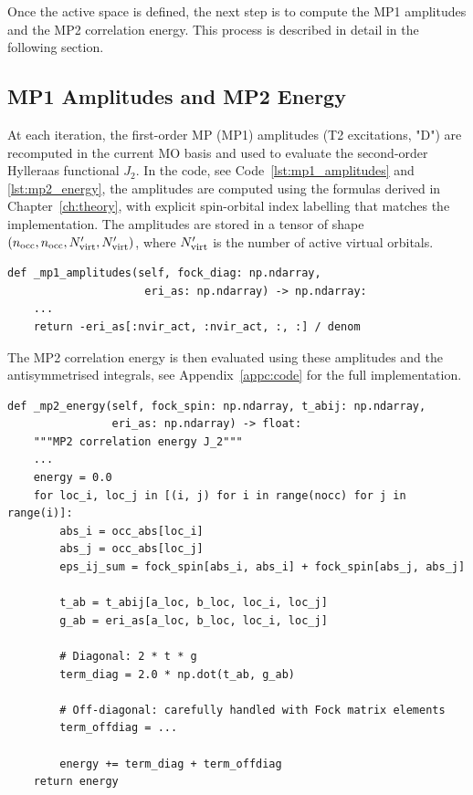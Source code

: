 Once the active space is defined, the next step is to compute the MP1 amplitudes and the MP2 correlation energy. This process is described in detail in the following section.

\subsection{MP1 Amplitudes and MP2 Energy}

At each iteration, the first-order MP (MP1) amplitudes (T2 excitations, "D") are recomputed in the current MO basis and used to evaluate the second-order Hylleraas functional $J_2$. In the code, see Code~\ref{lst:mp1_amplitudes} and \ref{lst:mp2_energy}, the amplitudes are computed using the formulas derived in Chapter~\ref{ch:theory}, with explicit spin-orbital index labelling that matches the implementation. The amplitudes are stored in a tensor of shape $(n_{\rm occ}, n_{\rm occ}, N'_{\rm virt}, N'_{\rm virt})$, where $N'_{\rm virt}$ is the number of active virtual orbitals. 

\begin{lstlisting}[style=python, caption={MP1 amplitude computation}, label=lst:mp1_amplitudes]
def _mp1_amplitudes(self, fock_diag: np.ndarray,
                     eri_as: np.ndarray) -> np.ndarray:
    ...
    return -eri_as[:nvir_act, :nvir_act, :, :] / denom
\end{lstlisting}

The MP2 correlation energy is then evaluated using these amplitudes and the antisymmetrised integrals, see Appendix~\ref{appc:code} for the full implementation. 

\begin{lstlisting}[style=python, caption={MP2 correlation energy}, label=lst:mp2_energy]
def _mp2_energy(self, fock_spin: np.ndarray, t_abij: np.ndarray,
                eri_as: np.ndarray) -> float:
    """MP2 correlation energy J_2"""
    ...
    energy = 0.0
    for loc_i, loc_j in [(i, j) for i in range(nocc) for j in range(i)]:
        abs_i = occ_abs[loc_i]
        abs_j = occ_abs[loc_j]
        eps_ij_sum = fock_spin[abs_i, abs_i] + fock_spin[abs_j, abs_j]
        
        t_ab = t_abij[a_loc, b_loc, loc_i, loc_j]
        g_ab = eri_as[a_loc, b_loc, loc_i, loc_j]
        
        # Diagonal: 2 * t * g
        term_diag = 2.0 * np.dot(t_ab, g_ab)
        
        # Off-diagonal: carefully handled with Fock matrix elements
        term_offdiag = ...
        
        energy += term_diag + term_offdiag
    return energy
\end{lstlisting}

